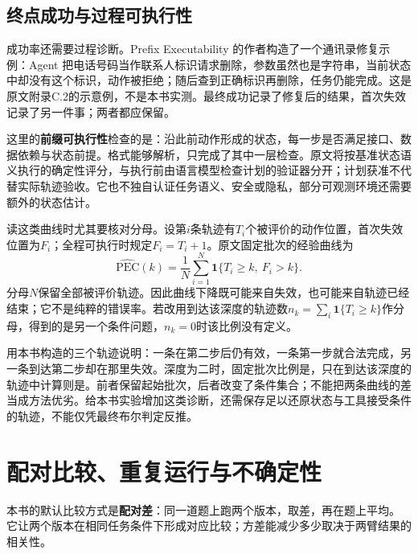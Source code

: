 \subsection{终点成功与过程可执行性}
\label{sec:ch03-prefix-executability}

成功率还需要过程诊断。Prefix Executability 的作者构造了一个通讯录修复示例：Agent 把电话号码当作联系人标识请求删除，参数虽然也是字符串，当前状态中却没有这个标识，动作被拒绝；随后查到正确标识再删除，任务仍能完成\cite{prefix-executability-2610}。这是原文附录C.2的示意例，不是本书实测。最终成功记录了修复后的结果，首次失效记录了另一件事；两者都应保留。

这里的\textbf{前缀可执行性}检查的是：沿此前动作形成的状态，每一步是否满足接口、数据依赖与状态前提。格式能够解析，只完成了其中一层检查。原文将按基准状态语义执行的确定性评分，与执行前由语言模型检查计划的验证器分开；计划获准不代替实际轨迹验收。它也不独自认证任务语义、安全或隐私，部分可观测环境还需要额外的状态估计\cite{prefix-executability-2610}。

读这类曲线时尤其要核对分母。设第$i$条轨迹有$T_i$个被评价的动作位置，首次失效位置为$F_i$；全程可执行时规定$F_i=T_i+1$。原文固定批次的经验曲线为
\begin{equation}
 \widehat{\mathrm{PEC}}(k)=\frac{1}{N}\sum_{i=1}^{N}
 \mathbf{1}\{T_i\ge k,\ F_i>k\}.
 \label{eq:ch03-prefix-executability}
\end{equation}
分母$N$保留全部被评价轨迹。因此曲线下降既可能来自失效，也可能来自轨迹已经结束；它不是纯粹的错误率。若改用到达该深度的轨迹数$n_k=\sum_i\mathbf{1}\{T_i\ge k\}$作分母，得到的是另一个条件问题，$n_k=0$时该比例没有定义\cite{prefix-executability-2610}。

用本书构造的三个轨迹说明：一条在第二步后仍有效，一条第一步就合法完成，另一条到达第二步却在那里失效。深度为二时，固定批次比例是，只在到达该深度的轨迹中计算则是。前者保留起始批次，后者改变了条件集合；不能把两条曲线的差当成方法优劣。给本书实验增加这类诊断，还需保存足以还原状态与工具接受条件的轨迹，不能仅凭最终布尔判定反推。

\section{配对比较、重复运行与不确定性}
\label{sec:ch03-paired}

\begin{sloppypar}
本书的默认比较方式是\textbf{配对差}：同一道题上跑两个版本，取差，再在题上平均。
它让两个版本在相同任务条件下形成对应比较；方差能减少多少取决于两臂结果的相关性。
\end{sloppypar}

